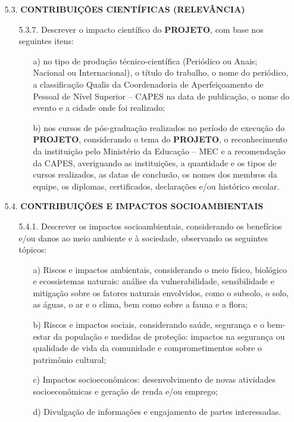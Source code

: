 {\begin{lmarginbox}
\begin{enumerate}[leftmargin=1cm, font=\bfseries]
\begin{enumerate}[font=\bfseries]
            \end{enumerate}

        \item[5.3.]	\textbf{CONTRIBUIÇÕES CIENTÍFICAS (RELEVÂNCIA)}
            \begin{enumerate}[font=\bfseries]
                \item[5.3.7.] Descrever o impacto científico do \textbf{PROJETO}, com base nos seguintes itens:
                    \begin{enumerate}[font=\bfseries]
                        \item[a)] no tipo de produção técnico-científica (Periódico ou Anais; Nacional ou Internacional), o título do trabalho, o nome do periódico, a classificação Qualis da Coordenadoria de Aperfeiçoamento de Pessoal de Nível Superior – CAPES na data de publicação, o nome do evento e a cidade onde foi realizado;
                        \item[b)] nos cursos de pós-graduação realizados no período de execução do \textbf{PROJETO}, considerando o tema do \textbf{PROJETO}, o reconhecimento da instituição pelo Ministério da Educação – MEC e a recomendação da CAPES, averiguando as instituições, a quantidade e os tipos de cursos realizados, as datas de conclusão, os nomes dos membros da equipe, os diplomas, certificados, declarações e/ou histórico escolar.
                    \end{enumerate}
            \end{enumerate}

        \item[5.4.]	\textbf{CONTRIBUIÇÕES E IMPACTOS SOCIOAMBIENTAIS}
            \begin{enumerate}[font=\bfseries]
                \item[5.4.1.] Descrever os impactos socioambientais, considerando os benefícios e/ou danos ao meio ambiente e à sociedade, observando os seguintes tópicos:
                    \begin{enumerate}[font=\bfseries]
                        \item[a)] Riscos e impactos ambientais, considerando o meio físico, biológico e ecossistemas naturais: análise da vulnerabilidade, sensibilidade e mitigação sobre os fatores naturais envolvidos, como o subsolo, o solo, as águas, o ar e o clima, bem como sobre a fauna e a flora;
                        \item[b)] Riscos e impactos sociais, considerando saúde, segurança e o bem-estar da população e medidas de proteção: impactos na segurança ou qualidade de vida da comunidade e comprometimentos sobre o patrimônio cultural;
                        \item[c)] Impactos socioeconômicos: desenvolvimento de novas atividades socioeconômicas e geração de renda e/ou emprego;
                        \item[d)] Divulgação de informações e engajamento de partes interessadas.


\end{enumerate}
\end{enumerate}
\end{enumerate}
\end{lmarginbox}}
